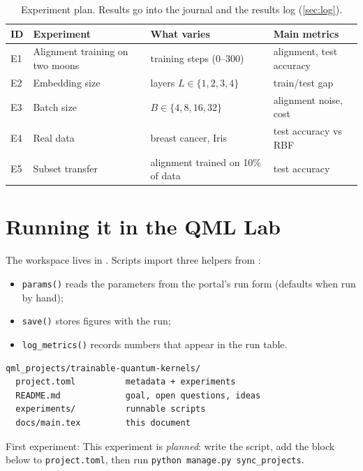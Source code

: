 \documentclass[11pt,a4paper]{article}
\begin{document}
\begin{table}[h]
\centering\small
\begin{tabularx}{\linewidth}{@{}l>{\raggedright}X>{\raggedright}X>{\raggedright\arraybackslash}X@{}}
\toprule
ID & Experiment & What varies & Main metrics \\
\midrule
  E1 & Alignment training on two moons & training steps (0--300) & alignment, test accuracy \\
  E2 & Embedding size & layers $L\in\{1,2,3,4\}$ & train/test gap \\
  E3 & Batch size & $B\in\{4,8,16,32\}$ & alignment noise, cost \\
  E4 & Real data & breast cancer, Iris & test accuracy vs RBF \\
  E5 & Subset transfer & alignment trained on 10\% of data & test accuracy \\
\bottomrule
\end{tabularx}
\caption{Experiment plan. Results go into the journal and the results log (\cref{sec:log}).}
\end{table}

\section{Running it in the QML Lab}
The workspace lives in . Scripts import three helpers from
:
\begin{itemize}
  \item \texttt{params()} reads the parameters from the portal's run form (defaults when run by hand);
  \item \texttt{save()} stores figures with the run;
  \item \texttt{log\_metrics()} records numbers that appear in the run table.
\end{itemize}

\begin{lstlisting}
qml_projects/trainable-quantum-kernels/
  project.toml          metadata + experiments
  README.md             goal, open questions, ideas
  experiments/          runnable scripts
  docs/main.tex         this document
\end{lstlisting}

First experiment: This experiment is \emph{planned}: write the script, add the block below to \texttt{project.toml}, then run \texttt{python manage.py sync\_projects}.
\end{document}
